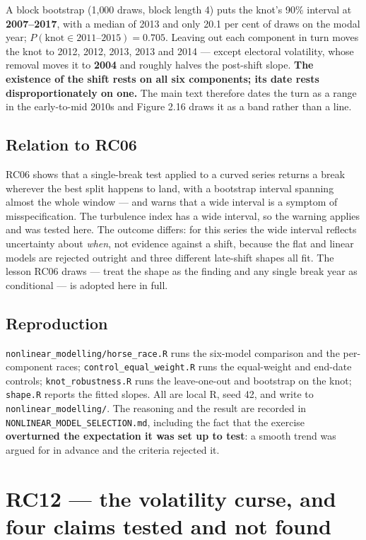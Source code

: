 A block bootstrap (1{,}000 draws, block length 4) puts the knot's 90\% interval at
\textbf{2007--2017}, with a median of 2013 and only 20.1 per cent of draws on the modal year;
$P(\text{knot} \in 2011\text{--}2015) = 0.705$. Leaving out each component in turn moves the knot to
2012, 2012, 2013, 2013 and 2014 --- except electoral volatility, whose removal moves it to
\textbf{2004} and roughly halves the post-shift slope. \textbf{The existence of the shift rests on
all six components; its date rests disproportionately on one.} The main text therefore dates the
turn as a range in the early-to-mid 2010s and Figure 2.16 draws it as a band rather than a line.

\subsection*{Relation to RC06}

RC06 shows that a single-break test applied to a curved series returns a break wherever the best
split happens to land, with a bootstrap interval spanning almost the whole window --- and warns that
a wide interval is a symptom of misspecification. The turbulence index has a wide interval, so the
warning applies and was tested here. The outcome differs: for this series the wide interval reflects
uncertainty about \emph{when}, not evidence against a shift, because the flat and linear models are
rejected outright and three different late-shift shapes all fit. The lesson RC06 draws --- treat the
shape as the finding and any single break year as conditional --- is adopted here in full.

\subsection*{Reproduction}

\texttt{nonlinear\_modelling/horse\_race.R} runs the six-model comparison and the per-component
races; \texttt{control\_equal\_weight.R} runs the equal-weight and end-date controls;
\texttt{knot\_robustness.R} runs the leave-one-out and bootstrap on the knot;
\texttt{shape.R} reports the fitted slopes. All are local R, seed 42, and write to
\texttt{nonlinear\_modelling/}. The reasoning and the result are recorded in
\texttt{NONLINEAR\_MODEL\_SELECTION.md}, including the fact that the exercise \textbf{overturned the
expectation it was set up to test}: a smooth trend was argued for in advance and the criteria
rejected it.

\section{RC12 --- the volatility curse, and four claims tested and not found}

